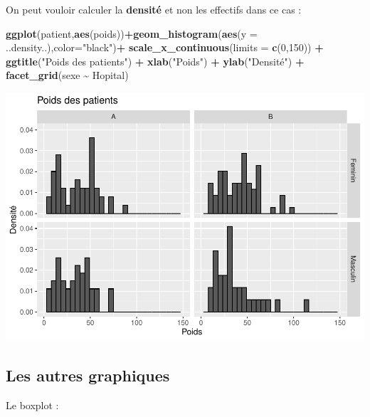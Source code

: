 \documentclass[
]{book}
\newenvironment{Shaded}{\begin{snugshade}}{\end{snugshade}}
\newcommand{\AttributeTok}[1]{\textcolor[rgb]{0.13,0.29,0.53}{#1}}
\newcommand{\DecValTok}[1]{\textcolor[rgb]{0.00,0.00,0.81}{#1}}
\newcommand{\FunctionTok}[1]{\textcolor[rgb]{0.13,0.29,0.53}{\textbf{#1}}}
\newcommand{\NormalTok}[1]{#1}
\newcommand{\SpecialCharTok}[1]{\textcolor[rgb]{0.81,0.36,0.00}{\textbf{#1}}}
\newcommand{\StringTok}[1]{\textcolor[rgb]{0.31,0.60,0.02}{#1}}
\begin{document}
On peut vouloir calculer la \textbf{densité} et non les effectifs dans ce cas :

\begin{Shaded}
\begin{Highlighting}[]
\FunctionTok{ggplot}\NormalTok{(patient,}\FunctionTok{aes}\NormalTok{(poids))}\SpecialCharTok{+}\FunctionTok{geom\_histogram}\NormalTok{(}\FunctionTok{aes}\NormalTok{(}\AttributeTok{y =}\NormalTok{ ..density..),}\AttributeTok{color=}\StringTok{"black"}\NormalTok{)}\SpecialCharTok{+}
  \FunctionTok{scale\_x\_continuous}\NormalTok{(}\AttributeTok{limits =} \FunctionTok{c}\NormalTok{(}\DecValTok{0}\NormalTok{,}\DecValTok{150}\NormalTok{)) }\SpecialCharTok{+} 
  \FunctionTok{ggtitle}\NormalTok{(}\StringTok{"Poids des patients"}\NormalTok{) }\SpecialCharTok{+} 
  \FunctionTok{xlab}\NormalTok{(}\StringTok{"Poids"}\NormalTok{) }\SpecialCharTok{+} 
  \FunctionTok{ylab}\NormalTok{(}\StringTok{"Densité"}\NormalTok{) }\SpecialCharTok{+}
  \FunctionTok{facet\_grid}\NormalTok{(sexe }\SpecialCharTok{\textasciitilde{}}\NormalTok{ Hopital)}
\end{Highlighting}
\end{Shaded}

\includegraphics{_main_files/figure-latex/ggplot11-1.pdf}

\hypertarget{les-autres-graphiques}{%
\subsection{Les autres graphiques}\label{les-autres-graphiques}}

Le boxplot :
\end{document}
